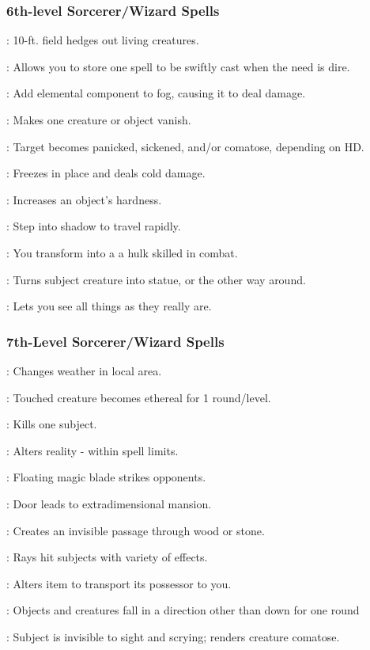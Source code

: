 \subsubsection{6th-level Sorcerer/Wizard Spells}
\begin{list}{}{\leftmargin=1em}
\item {}: 10-ft. field hedges out living creatures.
\item {}: Allows you to store one spell to be swiftly cast when the need is dire.
\item {}: Add elemental component to fog, causing it to deal damage.
\item {}: Makes one creature or object vanish.
\item {}: Target becomes panicked, sickened, and/or comatose, depending on HD.
\item {}: Freezes in place and deals cold damage.
\item {}: Increases an object's hardness.
\item {}: Step into shadow to travel rapidly.
\item {}: You transform into a a hulk skilled in combat.
\item {}: Turns subject creature into statue, or the other way around.
\item {}: Lets you see all things as they really are.
\end{list}
\subsubsection{7th-Level Sorcerer/Wizard Spells}
\begin{list}{}{\leftmargin=1em}
\item {}: Changes weather in local area.
\item {}: Touched creature becomes ethereal for 1 round/level.
\item {}: Kills one subject.
\item {}: Alters reality - within spell limits.
\item {}: Floating magic blade strikes opponents.
\item {}: Door leads to extradimensional mansion.
\item {}: Creates an invisible passage through wood or stone.
\item {}: Rays hit subjects with variety of effects.
\item {}: Alters item to transport its possessor to you.
\item {}: Objects and creatures fall in a direction other than down for one round
\item {}: Subject is invisible to sight and scrying; renders creature comatose.
\end{list}
